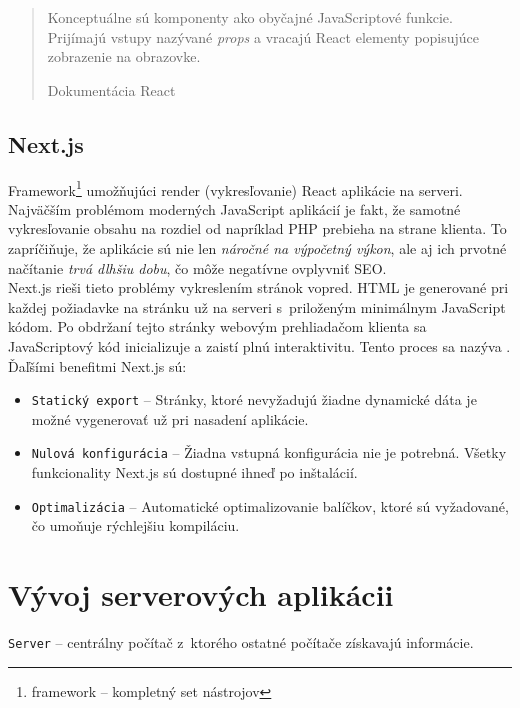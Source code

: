 \bigskip

\blockquote[Dokumentácia React \cite{React}]{Konceptuálne sú komponenty ako obyčajné JavaScriptové funkcie. Prijímajú vstupy nazývané \emph{props} a vracajú React elementy popisujúce zobrazenie na obrazovke.}

\subsection{Next.js}
Framework\footnote{framework -- kompletný set nástrojov} umožňujúci render (vykresľovanie) React aplikácie na serveri. \\

\noindent Najväčším problémom moderných JavaScript aplikácií je fakt, že samotné vykresľovanie obsahu na rozdiel od napríklad PHP prebieha na strane klienta. To zapríčiňuje, že aplikácie sú nie len \emph{náročné na výpočetný výkon}, ale aj ich prvotné načítanie \emph{trvá dlhšiu dobu}, čo môže negatívne ovplyvniť SEO. \\

\noindent Next.js rieši tieto problémy vykreslením stránok vopred. HTML je generované pri každej požiadavke na stránku už na serveri s~priloženým minimálnym JavaScript kódom. Po obdržaní tejto stránky webovým prehliadačom klienta sa JavaScriptový kód inicializuje a zaistí plnú interaktivitu. Tento proces sa nazýva . \cite{NextJS} \\

\noindent Ďaľšími benefitmi Next.js sú:
\begin{itemize}
	\item \texttt{Statický export} -- Stránky, ktoré nevyžadujú žiadne dynamické dáta je možné vygenerovať už pri nasadení aplikácie. \cite{NextJS}
	\item \texttt{Nulová konfigurácia} -- Žiadna vstupná konfigurácia nie je potrebná. Všetky funkcionality Next.js sú dostupné ihneď po inštalácií. \cite{NextJS}
	\item \texttt{Optimalizácia} -- Automatické optimalizovanie balíčkov, ktoré sú vyžadované, čo umoňuje rýchlejšiu kompiláciu. \cite{NextJS}
\end{itemize}

\section{Vývoj serverových aplikácii}
\label{section:server_dev}
\texttt{Server} -- centrálny počítač z~ktorého ostatné počítače získavajú informácie. \cite{CamDict} \\

